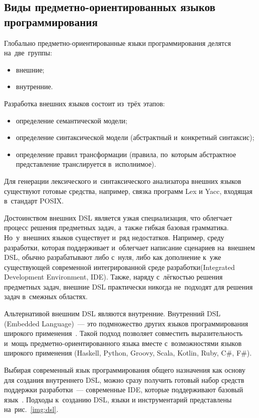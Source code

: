\subsection{Виды предметно-ориентированных языков программирования} \label{sub122}
Глобально предметно-ориентированные языки программирования делятся на~две~группы: 
\begin{itemize} 
	\item{внешние;}
	\item{внутренние.}
\end{itemize}

Разработка внешних языков состоит из~трёх этапов:

\begin{itemize} 
	\item{определение семантической модели;}
	\item{определение синтаксической модели (абстрактный и~конкретный синтаксис);}
	\item{определение правил трансформации (правила, по~которым абстрактное представление транслируется в~исполнимое).}
\end{itemize}

Для генерации лексического и~синтаксического анализатора внешних языков существуют готовые средства, например, связка программ Lex и Yacc, входящая в~стандарт POSIX. 

Достоинством внешних DSL является узкая специализация, что облегчает процесс решения предметных задач, а~также гибкая базовая грамматика. Но~у~внешних языков существует и~ряд недостатков. Например, среду разработки, которая поддерживает и~облегчает написание сценариев на~внешнем DSL, обычно разрабатывают либо с~нуля, либо как дополнение к~уже существующей современной интегрированной среде разработки(Integrated Development Environment, IDE). Также, наряду с~лёгкостью решения предметных задач, внешние DSL практически никогда не~подходят для решения задач в~смежных областях.

Альтернативой внешним DSL являются внутренние. Внутренний DSL (Embedded Language)~--- это подмножество других языков программирования широкого применения~\cite{VanDeursen2000}. Такой подход позволяет совместить выразительность и~мощь предметно-ориентированного языка вместе с~возможностями языков широкого применения (Haskell, Python, Groovy, Scala, Kotlin, Ruby, C\#, F\#). 

Выбирая современный язык программирования общего назначения как основу для создания внутреннего DSL, можно сразу получить готовый набор средств поддержки разработки~--- современные IDE, которые поддерживают базовый язык~\cite{Botov}. Подходы к~созданию DSL, языки и инструментарий представлены на~рис.~\ref{img:dsl}.

